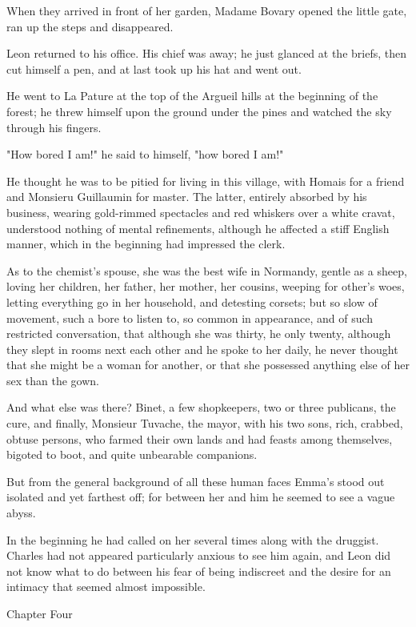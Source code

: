 \documentclass{tufte-book}
\begin{document}
When they arrived in front of her garden, Madame Bovary opened the
little gate, ran up the steps and disappeared.

Leon returned to his office. His chief was away; he just glanced at the
briefs, then cut himself a pen, and at last took up his hat and went
out.

He went to La Pature at the top of the Argueil hills at the beginning of
the forest; he threw himself upon the ground under the pines and watched
the sky through his fingers.

"How bored I am!" he said to himself, "how bored I am!"

He thought he was to be pitied for living in this village, with Homais
for a friend and Monsieru Guillaumin for master. The latter, entirely
absorbed by his business, wearing gold-rimmed spectacles and red
whiskers over a white cravat, understood nothing of mental refinements,
although he affected a stiff English manner, which in the beginning had
impressed the clerk.

As to the chemist's spouse, she was the best wife in Normandy, gentle
as a sheep, loving her children, her father, her mother, her cousins,
weeping for other's woes, letting everything go in her household, and
detesting corsets; but so slow of movement, such a bore to listen to, so
common in appearance, and of such restricted conversation, that although
she was thirty, he only twenty, although they slept in rooms next each
other and he spoke to her daily, he never thought that she might be a
woman for another, or that she possessed anything else of her sex than
the gown.

And what else was there? Binet, a few shopkeepers, two or three
publicans, the cure, and finally, Monsieur Tuvache, the mayor, with his
two sons, rich, crabbed, obtuse persons, who farmed their own lands
and had feasts among themselves, bigoted to boot, and quite unbearable
companions.

But from the general background of all these human faces Emma's stood
out isolated and yet farthest off; for between her and him he seemed to
see a vague abyss.

In the beginning he had called on her several times along with the
druggist. Charles had not appeared particularly anxious to see him
again, and Leon did not know what to do between his fear of being
indiscreet and the desire for an intimacy that seemed almost impossible.



Chapter Four
\end{document}
